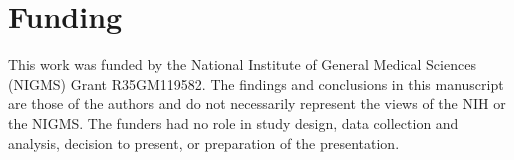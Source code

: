 \documentclass[preprint,authoryear,nonatbib]{elsarticle}
\begin{document}
\section{Funding}
This work was funded by the National Institute of General Medical Sciences (NIGMS) Grant R35GM119582. The findings and conclusions in this manuscript are those of the authors and do not necessarily represent the views of the NIH or the NIGMS. The funders had no role in study design, data collection and analysis, decision to present, or preparation of the presentation.


%
% 

\printshorthands[title = {Shorthands for references}]
\printbibliography[heading=bibintoc]
\end{document}
